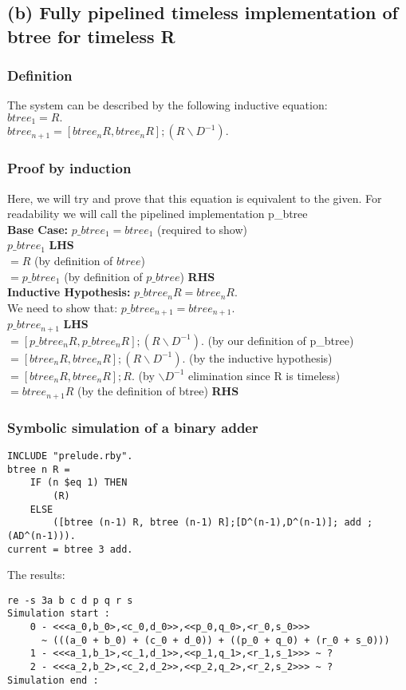 \documentclass[a4paper,10pt]{article}
\begin{document}
\subsection*{(b) Fully pipelined timeless implementation of btree for timeless R}
\subsubsection*{Definition}
The system can be described by the following inductive equation: \\[0.25cm]
$btree_1 = R.$ \\[0.25cm]
$btree_{n+1} = [btree_{n} R , btree_{n} R]; (R\backslash D^{-1}).$
\subsubsection*{Proof by induction}
Here, we will try and prove that this equation is equivalent to the given. For readability we will
call the pipelined implementation p\_btree \\[0.5cm]
\textbf{Base Case:}  $p\_btree_1 = btree_1$ (required to show)\\[0.25cm]
$p\_btree_1$ \textbf{LHS} \\[0.25cm]
$=R$  (by definition of $btree$) \\[0.25cm]
$=p\_btree_1 $ (by definition of $p\_btree$) \textbf{RHS}
\\[0.5cm]
\textbf{Inductive Hypothesis:} $p\_btree_n R = btree_n R.$ \\[0.25cm]	
We need to show that: $p\_btree_{n+1} = btree_{n+1}.$ \\[0.25cm]
$p\_btree_{n+1}$ \textbf{LHS} \\[0.25cm]
$= [p\_btree_{n} R, p\_btree_{n} R]; (R\backslash D^{-1}).$ (by our definition of p\_btree) \\[0.25cm] 
$= [btree_{n} R, btree_{n} R]; (R\backslash D^{-1}).$ (by the inductive hypothesis) \\[0.25cm] 
$= [btree_{n} R, btree_{n} R];R.$ (by $\backslash D^{-1}$ elimination since R is timeless) \\[0.25cm]
$= btree_{n+1} R $ (by the definition of btree) \textbf{RHS}
\subsubsection*{Symbolic simulation of a binary adder}
\begin{Verbatim}
INCLUDE "prelude.rby".
btree n R = 
	IF (n $eq 1) THEN
		(R) 
	ELSE 
		([btree (n-1) R, btree (n-1) R];[D^(n-1),D^(n-1)]; add ; (AD^(n-1))).
current = btree 3 add.
\end{Verbatim}
The results:
\begin{Verbatim}
re -s 3a b c d p q r s
Simulation start :
    0 - <<<a_0,b_0>,<c_0,d_0>>,<<p_0,q_0>,<r_0,s_0>>> 
	  ~ (((a_0 + b_0) + (c_0 + d_0)) + ((p_0 + q_0) + (r_0 + s_0)))
    1 - <<<a_1,b_1>,<c_1,d_1>>,<<p_1,q_1>,<r_1,s_1>>> ~ ?
    2 - <<<a_2,b_2>,<c_2,d_2>>,<<p_2,q_2>,<r_2,s_2>>> ~ ?
Simulation end :
\end{Verbatim}
\end{document}
